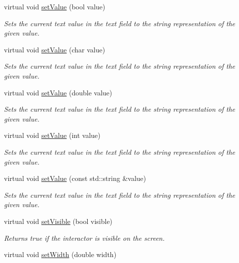 \begin{DoxyCompactItemize}
virtual void \mbox{\hyperlink{classGTextField_ae803b3348fa7076308d852bbdeea0d74}{set\+Value}} (bool value)
\begin{DoxyCompactList}\small\item\em Sets the current text value in the text field to the string representation of the given value. \end{DoxyCompactList}\item 
virtual void \mbox{\hyperlink{classGTextField_aeefe59b3d414b657838869ce084cb0e2}{set\+Value}} (char value)
\begin{DoxyCompactList}\small\item\em Sets the current text value in the text field to the string representation of the given value. \end{DoxyCompactList}\item 
virtual void \mbox{\hyperlink{classGTextField_a1a31743bc7def7cf7fdad044c84d9268}{set\+Value}} (double value)
\begin{DoxyCompactList}\small\item\em Sets the current text value in the text field to the string representation of the given value. \end{DoxyCompactList}\item 
virtual void \mbox{\hyperlink{classGTextField_a23d79e21b8ed72e19278ca31d47b8c87}{set\+Value}} (int value)
\begin{DoxyCompactList}\small\item\em Sets the current text value in the text field to the string representation of the given value. \end{DoxyCompactList}\item 
virtual void \mbox{\hyperlink{classGTextField_ab18c7a418be64c4f909beebc277a1321}{set\+Value}} (const std\+::string \&value)
\begin{DoxyCompactList}\small\item\em Sets the current text value in the text field to the string representation of the given value. \end{DoxyCompactList}\item 
virtual void \mbox{\hyperlink{classGInteractor_a18e44e30b31525a243960ca3928125aa}{set\+Visible}} (bool visible)
\begin{DoxyCompactList}\small\item\em Returns true if the interactor is visible on the screen. \end{DoxyCompactList}\item 
virtual void \mbox{\hyperlink{classGInteractor_aa3f3fba4cb131baa8696ba01e3bceca1}{set\+Width}} (double width)

\end{DoxyCompactItemize}
